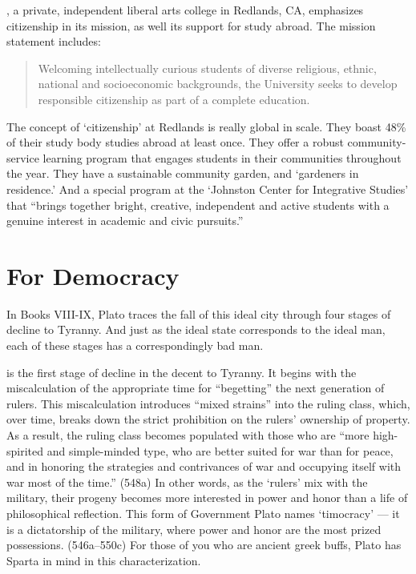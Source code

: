 , a private, independent liberal arts college in Redlands, CA, emphasizes citizenship in its mission, as well its support for study abroad. The mission statement includes:

\begin{quote}

Welcoming intellectually curious students of diverse religious, ethnic, national and socioeconomic backgrounds, the University seeks to develop responsible citizenship as part of a complete education.
\end{quote}

The concept of `citizenship' at Redlands is really global in scale. They boast 48\% of their study body studies abroad at least once. They offer a robust community-service learning program that engages students in their communities throughout the year. They have a sustainable community garden, and `gardeners in residence.' And a special program at the `Johnston Center for Integrative Studies' that ``brings together bright, creative, independent and active students with a genuine interest in academic and civic pursuits.''

\section{For Democracy}
\label{fordemocracy}

In Books VIII-IX, Plato traces the fall of this ideal city through four stages of decline to Tyranny. And just as the ideal state corresponds to the ideal man, each of these stages has a correspondingly bad man. 

 is the first stage of decline in the decent to Tyranny. It begins with the miscalculation of the appropriate time for ``begetting'' the next generation of rulers. This miscalculation introduces ``mixed strains'' into the ruling class, which, over time, breaks down the strict prohibition on the rulers' ownership of property. As a result, the ruling class becomes populated with those who are ``more high-spirited and simple-minded type, who are better suited for war than for peace, and in honoring the strategies and contrivances of war and occupying itself with war most of the time.'' (548a) In other words, as the `rulers' mix with the military, their progeny becomes more interested in power and honor than a life of philosophical reflection. This form of Government Plato names `timocracy' --- it is a dictatorship of the military, where power and honor are the most prized possessions. (546a--550c) For those of you who are ancient greek buffs, Plato has Sparta in mind in this characterization.

